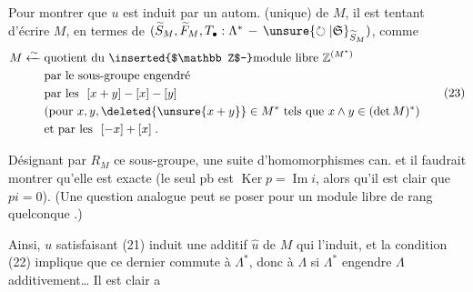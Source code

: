 Pour montrer que $u$ est induit par un
autom. (unique) de $M$, il est tentant
d'écrire $M$, en termes de 
 $(\widetilde S_M,\widetilde F_M,T_\bullet:\Lambda^*\,-\,\unsure{\circlearrowright|\mathfrak S}_{\widetilde S_M})$, comme
\[
\begin{aligned}
M\xleftarrow{\sim}{}&\text{quotient du \inserted{$\mathbb Z$-}module libre }\mathbb Z^{(M^*)}\\
&\text{par le sous-groupe engendré}\\
&\text{par les }\ [x+y]-[x]-[y]\\
&\text{(pour }x,y,\deleted{\unsure{x+y}}\in M^*\ \text{tels que }x\wedge y\in(\det M)^*)\\
&\text{et par les }\ [-x]+[x]\;.
\end{aligned}\tag*{(23)}
\]

Désignant par $R_M$ ce sous-groupe,
une suite d'homomorphismes can.
et il faudrait montrer qu'elle est
exacte (le seul pb  est $\operatorname{Ker}p=\operatorname{Im}i$,
alors qu'il est clair que $pi=0$). (Une
question analogue peut se poser pour un
module libre de rang quelconque .)

Ainsi, $u$ satisfaisant (21) induit une
 additif $\widehat u$ de $M$ qui l'induit,
et la condition (22) implique que ce
dernier commute à $\Lambda^*$, donc à $\Lambda$ si $\Lambda^*$
engendre $\Lambda$ additivement\ldots{} Il est clair a
